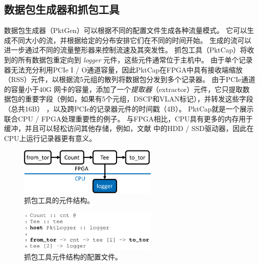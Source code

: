 \subsection{数据包生成器和抓包工具}
数据包生成器（PktGen）可以根据不同的配置文件生成各种流量模式。
它可以生成不同大小的流，并根据给定的分布安排它们在不同的时间开始。
生成的流可以进一步通过不同的流量整形器来控制流速及其突发性。
抓包工具（PktCap）将收到的所有数据包重定向到 \textit {logger} 元件，这些元件通常位于主机中。
由于单个记录器无法充分利用PCIe I / O通道容量，因此PktCap在FPGA中具有接收端缩放（RSS）元件，以根据流5元组的散列将数据包分发到多个记录器。
由于PCIe通道的容量小于40G 网卡的容量，添加了一个\textit {提取器}（extractor）元件，它只提取数据包的重要字段（例如，如果有5个元组，DSCP和VLAN标记），并转发这些字段（总共16B） ，以及跨PCIe的记录器元件的时间戳（4B）。
PktCap就是一个展示联合CPU / FPGA处理重要性的例子。
与FPGA相比，CPU具有更多的内存用于缓冲，并且可以轻松访问其他存储，例如，文献 \cite{lee2015flosis} 中的HDD / SSD驱动器，因此在CPU上运行记录器更有意义。


\begin{figure}[htbp]
	\centering
	\includegraphics[width=0.6\textwidth]{image/packet-capture}
	\caption{抓包工具的元件结构。}
	\label{clicknp:fig:packet-capture}
\end{figure}


\begin{figure}[htbp]
	\centering
	\includegraphics[width=0.6\textwidth]{image/logger-config}
	\caption{抓包工具元件结构的配置文件。}
	\label{clicknp:fig:logger-config}
\end{figure}




